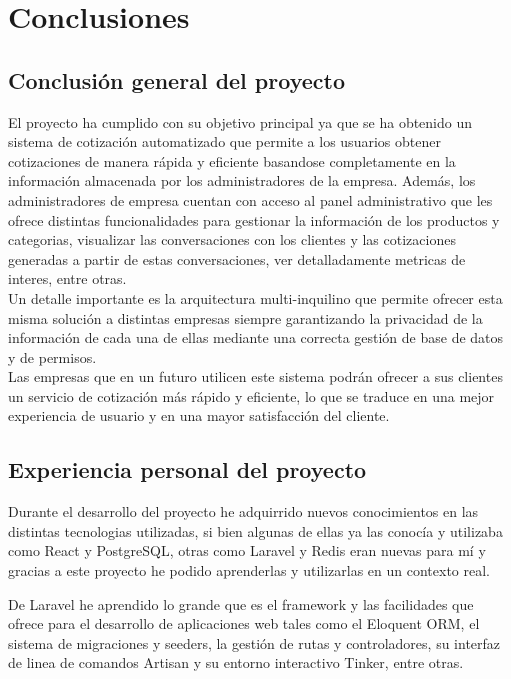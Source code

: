 \section{Conclusiones}
\label{ch:conclusiones}

\subsection{Conclusión general del proyecto}
\label{sec:conclusion-general}

El proyecto ha cumplido con su objetivo principal ya que se ha obtenido un sistema de cotización automatizado que permite a los usuarios obtener cotizaciones de manera rápida y eficiente basandose completamente en la información almacenada por los administradores de la empresa. Además, los administradores de empresa cuentan con acceso al panel administrativo que les ofrece distintas funcionalidades para gestionar la información de los productos y categorias, visualizar las conversaciones con los clientes y las cotizaciones generadas a partir de estas conversaciones, ver detalladamente metricas de interes, entre otras.\\
Un detalle importante es la arquitectura multi-inquilino que permite ofrecer esta misma solución a distintas empresas siempre garantizando la privacidad de la información de cada una de ellas mediante una correcta gestión de base de datos y de permisos.\\
Las empresas que en un futuro utilicen este sistema podrán ofrecer a sus clientes un servicio de cotización más rápido y eficiente, lo que se traduce en una mejor experiencia de usuario y en una mayor satisfacción del cliente.

\subsection{Experiencia personal del proyecto}
\label{sec:experiencia-personal}

Durante el desarrollo del proyecto he adquirrido nuevos conocimientos en las distintas tecnologias utilizadas, si bien algunas de ellas ya las conocía y utilizaba como React y PostgreSQL, otras como Laravel y Redis eran nuevas para mí y gracias a este proyecto he podido aprenderlas y utilizarlas en un contexto real.

De Laravel he aprendido lo grande que es el framework y las facilidades que ofrece para el desarrollo de aplicaciones web tales como el Eloquent ORM, el sistema de migraciones y seeders, la gestión de rutas y controladores, su interfaz de linea de comandos Artisan y su entorno interactivo Tinker, entre otras.

